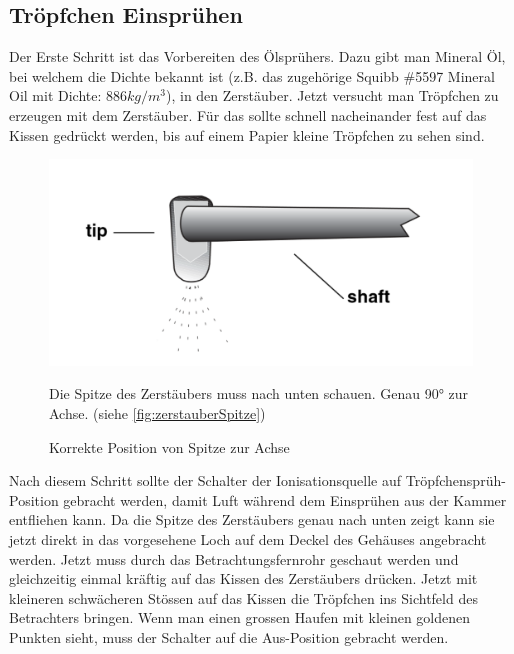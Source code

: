 \subsection{Tröpfchen Einsprühen}\label{sub:tröpfchensprühen}
Der Erste Schritt ist das Vorbereiten des Ölsprühers. Dazu gibt man Mineral Öl, bei welchem die Dichte bekannt ist (z.B. das zugehörige Squibb \#5597 Mineral Oil mit Dichte: $886 kg/m^3$), in den Zerstäuber. Jetzt versucht man Tröpfchen zu erzeugen mit dem Zerstäuber. Für das sollte schnell nacheinander fest auf das Kissen gedrückt werden, bis auf einem Papier kleine Tröpfchen zu sehen sind.
\begin{figure}[h]
	\begin{minipage}[t]{0.45\textwidth}
		\centering
		\includegraphics[width=\textwidth]{bilder/pdf/zerstauberSpitze.pdf}
		\caption{Korrekte Position von Spitze zur Achse}
		\label{fig:zerstauberSpitze}
	\end{minipage}
	\hfill
	\begin{minipage}[t]{0.45\textwidth}
		Die Spitze des Zerstäubers muss nach unten schauen. Genau 90° zur Achse. (siehe \autoref{fig:zerstauberSpitze})
	\end{minipage} 
\end{figure}

Nach diesem Schritt sollte der Schalter der Ionisationsquelle auf Tröpfchensprüh-Position gebracht werden, damit Luft während dem Einsprühen aus der Kammer entfliehen kann. Da die Spitze des Zerstäubers genau nach unten zeigt kann sie jetzt direkt in das vorgesehene Loch auf dem Deckel des Gehäuses angebracht werden. Jetzt muss durch das Betrachtungsfernrohr geschaut werden und gleichzeitig einmal kräftig auf das Kissen des Zerstäubers drücken. Jetzt mit kleineren schwächeren Stössen auf das Kissen die Tröpfchen ins Sichtfeld des Betrachters bringen. Wenn man einen grossen Haufen mit kleinen goldenen Punkten sieht, muss der Schalter auf die Aus-Position gebracht werden. 


